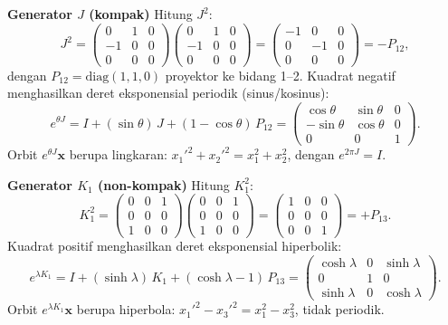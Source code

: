 \vspace{0.5em}
\noindent \textbf{Generator $J$ (kompak)}
Hitung $J^2$:
\begin{equation}
    J^2 = \begin{pmatrix}0&1&0\\-1&0&0\\0&0&0\end{pmatrix}\!\begin{pmatrix}0&1&0\\-1&0&0\\0&0&0\end{pmatrix}
    = \begin{pmatrix}-1&0&0\\0&-1&0\\0&0&0\end{pmatrix} = -P_{12},
\end{equation}
dengan $P_{12} = \mathrm{diag}(1,1,0)$ proyektor ke bidang 1--2. Kuadrat negatif menghasilkan deret eksponensial periodik (sinus/kosinus):
\begin{equation}\label{a2-eq:exp-J}
    e^{\theta J} = I + (\sin\theta)\,J + (1 - \cos\theta)\,P_{12}
    = \begin{pmatrix}\cos\theta & \sin\theta & 0 \\ -\sin\theta & \cos\theta & 0 \\ 0 & 0 & 1\end{pmatrix}.
\end{equation}
Orbit $e^{\theta J}\mathbf{x}$ berupa lingkaran: $x_1'^2 + x_2'^2 = x_1^2 + x_2^2$, dengan $e^{2\pi J} = I$.

\vspace{0.5em}
\noindent \textbf{Generator $K_1$ (non-kompak)}
Hitung $K_1^2$:
\begin{equation}
    K_1^2 = \begin{pmatrix}0&0&1\\0&0&0\\1&0&0\end{pmatrix}\!\begin{pmatrix}0&0&1\\0&0&0\\1&0&0\end{pmatrix}
    = \begin{pmatrix}1&0&0\\0&0&0\\0&0&1\end{pmatrix} = +P_{13}.
\end{equation}
Kuadrat positif menghasilkan deret eksponensial hiperbolik:
\begin{equation}\label{a2-eq:exp-K1}
    e^{\lambda K_1} = I + (\sinh\lambda)\,K_1 + (\cosh\lambda - 1)\,P_{13}
    = \begin{pmatrix}\cosh\lambda & 0 & \sinh\lambda \\ 0 & 1 & 0 \\ \sinh\lambda & 0 & \cosh\lambda\end{pmatrix}.
\end{equation}
Orbit $e^{\lambda K_1}\mathbf{x}$ berupa hiperbola: $x_1'^2 - x_3'^2 = x_1^2 - x_3^2$, tidak periodik.

